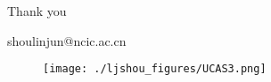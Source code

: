 \documentclass[mathserif]{beamer}
\begin{document}
\begin{CJK}{UTF8}{gkai}
\begin{frame}
\begin{enumerate}
\end{enumerate}
\end{frame}


\begin{frame}	
\begin{block}
	\Huge{\centerline{Thank you}}
	\centerline{shoulinjun@ncic.ac.cn}
\end{block}
\begin{figure}
	\texttt{[image: ./ljshou\_figures/UCAS3.png]}
\end{figure}
\end{frame}
	
\end{CJK}
\end{document}
